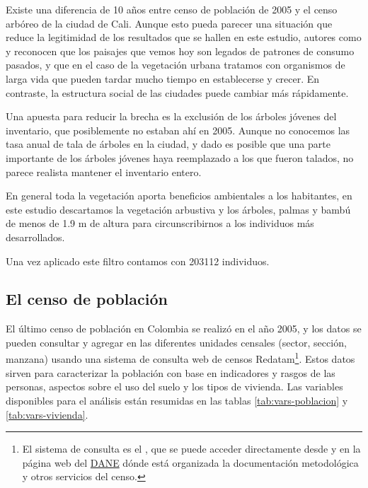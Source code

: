 \documentclass[12pt,]{book}
\let\rmarkdownfootnote\footnote%
\def\footnote{\protect\rmarkdownfootnote}
\begin{document}
Existe una diferencia de 10 años entre censo de población de 2005 y el
censo arbóreo de la ciudad de Cali. Aunque esto pueda parecer una
situación que reduce la legitimidad de los resultados que se hallen en
este estudio, autores como \citet{boone2010landscape} y
\citet{schwarz_trees_2015} reconocen que los paisajes que vemos hoy son
legados de patrones de consumo pasados, y que en el caso de la
vegetación urbana tratamos con organismos de larga vida que pueden
tardar mucho tiempo en establecerse y crecer. En contraste, la
estructura social de las ciudades puede cambiar más rápidamente.

Una apuesta para reducir la brecha es la exclusión de los árboles
jóvenes del inventario, que posiblemente no estaban ahí en 2005. Aunque
no conocemos las tasa anual de tala de árboles en la ciudad, y dado es
posible que una parte importante de los árboles jóvenes haya reemplazado
a los que fueron talados, no parece realista mantener el inventario
entero.

En general toda la vegetación aporta beneficios ambientales a los
habitantes, en este estudio descartamos la vegetación arbustiva y los
árboles, palmas y bambú de menos de 1.9 m de altura para
circunscribirnos a los individuos más desarrollados.

Una vez aplicado este filtro contamos con 203112 individuos.

\subsection{El censo de población}\label{el-censo-de-poblacion}

El último censo de población en Colombia se realizó en el año 2005, y
los datos se pueden consultar y agregar en las diferentes unidades
censales (sector, sección, manzana) usando una sistema de consulta web
de censos Redatam\footnote{El sistema de consulta es el
  \citep{cepal_redatam_nodate}, que se puede acceder directamente desde
  \citep{dane_cepal_celade_2005} y en la página web del
  \href{http://www.dane.gov.co/index.php/estadisticas-por-tema/demografia-y-poblacion/censo-general-2005-1}{DANE}
  dónde está organizada la documentación metodológica y otros servicios
  del censo.}. Estos datos sirven para caracterizar la población con
base en indicadores y rasgos de las personas, aspectos sobre el uso del
suelo y los tipos de vivienda. Las variables disponibles para el
análisis están resumidas en las tablas \ref{tab:vars-poblacion} y
\ref{tab:vars-vivienda}.
\end{document}
